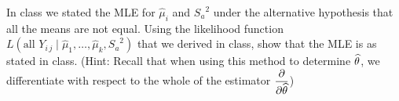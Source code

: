 In class we stated the MLE for $\widehat{\mu}_i$ and ${S_a}^2$ under the alternative hypothesis that all the means are not equal. Using the likelihood function $L( \text{all } Y_{i\,j} \mid \widehat{\mu}_1 , \dots, \widehat{\mu}_k, {S_a}^2)$ that we derived in class, show that the MLE is as stated in class. (Hint: Recall that when using this method to determine $\widehat{\theta}$, we differentiate with respect to the whole of the estimator $\displaystyle \pdv{\widehat{\theta}}$)